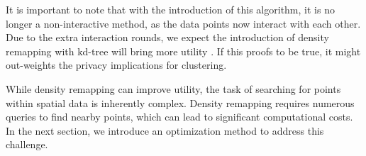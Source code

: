 


It is important to note that with the introduction of this algorithm, it is no longer a non-interactive method, as the data points now interact with each other.
Due to the extra interaction rounds, we expect the introduction of density remapping with kd-tree will bring more utility \citep{wang_comprehensive_2020, xiongComprehensiveSurveyLocal2020}.
If this proofs to be true, it might out-weights the privacy implications for clustering.  \newline

While density remapping can improve utility, the task of searching for points within spatial data is inherently complex. Density remapping requires numerous queries to find nearby points, which can lead to significant computational costs. In the next section, we introduce an optimization method to address this challenge.

